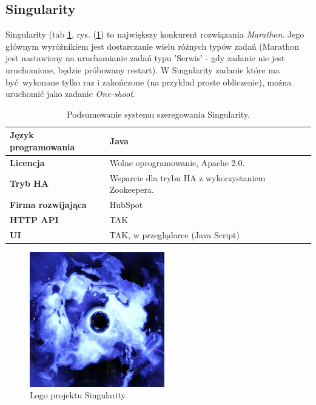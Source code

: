 \documentclass[10pt,a4paper,titlepage,twoside]{report}
\begin{document}


\subsection{Singularity}
Singularity (tab \ref{singularity_info}, rys. (\ref{singularity_logo}) to największy konkurent rozwiązania \textit{Marathon}. Jego głównym wyróżnikiem jest dostarczanie wielu różnych typów zadań (Marathon jest nastawiony na uruchamianie zadań typu 'Serwis' - gdy zadanie nie jest uruchomione, będzie próbowany restart). W Singularity zadanie które ma być wykonane tylko raz i zakończone (na przykład proste obliczenie), można uruchomić jako zadanie \textit{One-shoot}. 
\begin{table}[!h]
\caption{Podsumowanie systemu szeregowania Singularity.}
\label{singularity_info}
\centering
\begin{tabular}{|p{4cm}|p{6cm}|}
  \hline
  \textbf{Język programowania} & Java \\
  \hline
  \textbf{Licencja} & Wolne oprogramowanie, Apache 2.0. \\
  \hline
  \textbf{Tryb HA} & Wsparcie dla trybu HA z wykorzystaniem Zookeepera. \\
  \hline
  \textbf{Firma rozwijająca} & HubSpot \\
  \hline
  \textbf{HTTP API} & TAK \\
  \hline
  \textbf{UI} & TAK, w przeglądarce (Java Script) \\
  \hline
\end{tabular}
\end{table}

\begin{figure}[!h]
	\centering
	\includegraphics[scale=0.5]{pics/singularity.png}
	\caption{Logo projektu Singularity.}
	\label{singularity_logo}
\end{figure}
\end{document}
